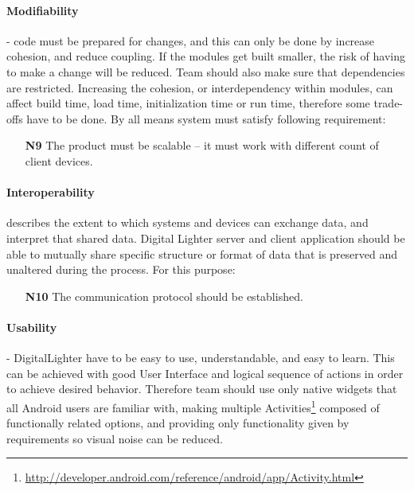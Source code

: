 \paragraph{Modifiability}
- code must be prepared for changes, and this can only be done by increase cohesion, and reduce coupling. 
If the modules get built smaller, the risk of having to make a change will be reduced. 
Team should also make sure that dependencies are restricted. 
Increasing the cohesion, or interdependency within modules, can affect build time, load time, initialization time or run time, therefore some trade-offs have to be done. By all means system must satisfy following requirement:
\begin{itemize}
\item[\textbf{N9}] \label{req_N9} The product must be scalable -- it must work with  different count of client devices.
\end{itemize}

\paragraph{Interoperability}
describes the extent to which systems and devices can exchange data, and interpret that shared data. Digital Lighter server and client application should be able to mutually share specific structure or format of data that is preserved and unaltered during the process. For this purpose:
\begin{itemize}
\item[\textbf{N10}] \label{req_N10} The communication protocol should be established.
\end{itemize}

\paragraph{Usability} - DigitalLighter have to be easy to use, understandable, and easy to learn. This can be achieved with good User Interface and logical sequence of actions in order to achieve desired behavior. Therefore team should use only native widgets that all Android users are familiar with, making multiple Activities\footnote{\url{http://developer.android.com/reference/android/app/Activity.html}} composed of functionally related options, and providing only functionality given by requirements so visual noise can be reduced. 


